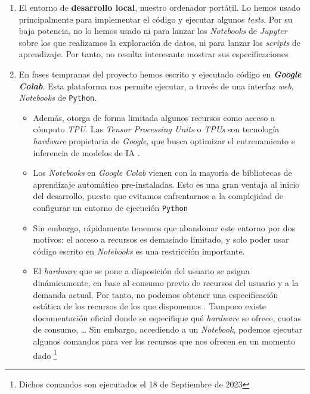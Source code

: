 \begin{enumerate}
    \item El entorno de \textbf{desarrollo local}, nuestro ordenador portátil. Lo hemos usado principalmente para implementar el código y ejecutar algunos \textit{tests}. Por su baja potencia, no lo hemos usado ni para lanzar los \textit{Notebooks} de \textit{Jupyter} sobre los que realizamos la exploración de datos, ni para lanzar los \textit{scripts} de aprendizaje. Por tanto, no resulta interesante mostrar sus especificaciones

    \item En fases tempranas del proyecto hemos escrito y ejecutado código en \textbf{\textit{Google Colab}}. Esta plataforma nos permite ejecutar, a través de una interfaz \textit{web}, \textit{Notebooks} de \lstinline{Python}.

        \begin{itemize}
            \item Además, otorga de forma limitada algunos recursos como acceso a cómputo \textit{TPU}. Las \textit{Tensor Processing Units} o \textit{TPUs} son tecnología \textit{hardware} propietaria de \textit{Google}, que busca optimizar el entrenamiento e inferencia de modelos de IA \cite{informatica:google_tpu}.

            \item Los \textit{Notebooks} en \textit{Google Colab} vienen con la mayoría de bibliotecas de aprendizaje automático pre-instaladas. Esto es una gran ventaja al inicio del desarrollo, puesto que evitamos enfrentarnos a la complejidad de configurar un entorno de ejecución \lstinline{Python}

            \item Sin embargo, rápidamente tenemos que abandonar este entorno por dos motivos: el acceso a recursos es demasiado limitado, y solo poder usar código escrito en \textit{Notebooks} es una restricción importante.

            \item El \textit{hardware} que se pone a disposición del usuario se asigna dinámicamente, en base al consumo previo de recursos del usuario y a la demanda actual. Por tanto, no podemos obtener una especificación estática de los recursos de los que disponemos \cite{informatica:google_colab_faq}. Tampoco existe documentación oficial donde se especifique qué \textit{hardware} se ofrece, cuotas de consumo, \ldots\; Sin embargo, accediendo a un \textit{Notebook}, podemos ejecutar algunos comandos para ver los recursos que nos ofrecen en un momento dado \footnote{Dichos comandos son ejecutados el 18 de Septiembre de 2023}


\end{itemize}
\end{enumerate}
